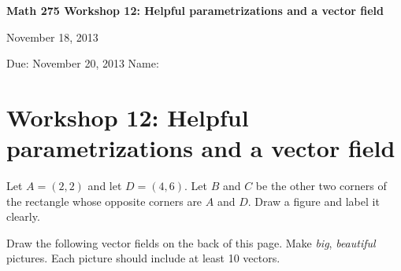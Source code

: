 \documentclass[12pt]{exam}
\theoremstyle{definition}
\begin{document}
\noindent
\textbf{{\large Math 275 \hfill Workshop 12: Helpful parametrizations and a vector field}}

\noindent
November 18, 2013 

\noindent
Due: November 20, 2013 \hfill Name: \underline{\hspace{3in}} 

\noindent

\section{Workshop 12: Helpful parametrizations and a vector field}

\begin{questions}

\question Let $A = (2,2)$ and let $D = (4,6)$. Let $B$ and $C$ be the other two corners of the rectangle whose opposite corners are $A$ and $D$. Draw a figure and label it clearly.



\question Draw the following vector fields on the back of this page. Make \emph{big}, \emph{beautiful} pictures. Each picture should include at least 10 vectors.

\end{questions}
\end{document}
